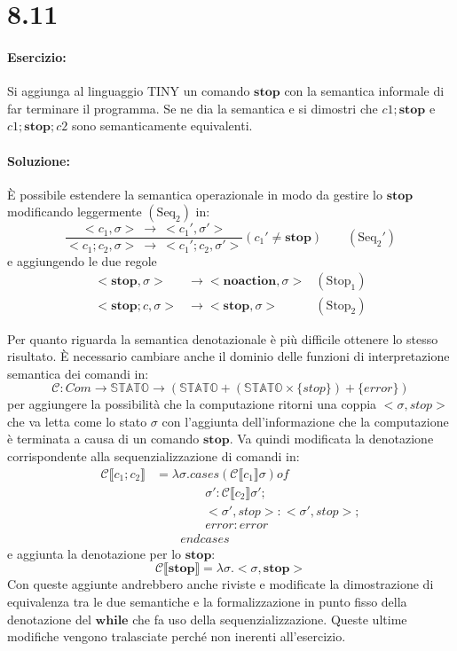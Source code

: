 \documentclass[a4paper,twosides]{report}
\begin{document}
\section*{8.11}
\paragraph{Esercizio:} Si aggiunga al linguaggio TINY un comando $\mathbf{stop}$
con la semantica informale di far terminare il 
programma. Se ne dia la semantica e si dimostri che $c 1 ; \mathbf{stop}$ e $c 1 ;
\mathbf{stop}; c 2$ sono semanticamente
equivalenti.

\paragraph{Soluzione:}
\`E possibile estendere la semantica operazionale in modo da gestire
lo $\mathbf{stop}$ modificando leggermente $(\text{Seq}_2)$ in:
$$
\frac{<c_1,\sigma>\ \longrightarrow\ <c_1',\sigma'>}{<c_1;c_2,\sigma>\
  \longrightarrow\ <c_1';c_2,\sigma'>}(c_1'\neq\mathbf{stop})\qquad (\text{Seq}_2')
$$
e aggiungendo le due regole
\begin{align*}
<\mathbf{stop},\sigma>&\longrightarrow{} <\mathbf{noaction},\sigma>&(\text{Stop}_1)\\
<\mathbf{stop};c,\sigma>&\longrightarrow{} <\mathbf{stop},\sigma>&(\text{Stop}_2)
\end{align*}

Per quanto riguarda la semantica denotazionale \`e pi\`u difficile
ottenere lo stesso risultato. \`E necessario cambiare anche il dominio
delle funzioni di interpretazione semantica dei comandi in:
$$
\mathcal{C}: Com\longrightarrow{}\mathbb{STATO}\longrightarrow{}(\mathbb{STATO}+(\mathbb{STATO}\times\{stop\})+\{error\})
$$
per aggiungere la possibilit\`a che la computazione ritorni una coppia
$<\sigma,stop>$ che va letta come lo stato $\sigma$ con
l'aggiunta dell'informazione che la computazione \`e terminata a causa
di un comando $\mathbf{stop}$. Va quindi modificata la denotazione
corrispondente alla sequenzializzazione di comandi in:
\begin{align*}
  \mathcal{C}\llbracket c_1;c_2\rrbracket&= \lambda\sigma.cases (\mathcal{C}\llbracket c_1\rrbracket\sigma)
  of\\
&\qquad\qquad\sigma':\mathcal{C}\llbracket c_2\rrbracket\sigma';\\
&\qquad\qquad<\sigma',stop>:<\sigma',stop>;\\
&\qquad\qquad error : error\\
&\qquad endcases
\end{align*}
e aggiunta la denotazione per lo $\mathbf{stop}$:
$$
\mathcal{C}\llbracket\mathbf{stop}\rrbracket=\lambda\sigma.<\sigma,\mathbf{stop}>
$$
Con queste aggiunte andrebbero anche riviste e  modificate la dimostrazione di
equivalenza tra le due semantiche e la formalizzazione in punto fisso della
denotazione del $\mathbf{while}$ che fa uso della
sequenzializzazione. Queste ultime modifiche vengono tralasciate
perch\'e non inerenti all'esercizio.
\end{document}
